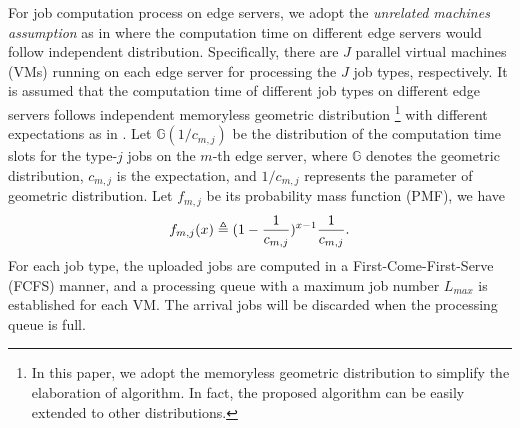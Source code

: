 For job computation process on edge servers, we adopt the \emph{unrelated machines assumption} as in \cite{tan-online} where the computation time on different edge servers would follow independent distribution.
Specifically, there are $J$ parallel virtual machines (VMs) running on each edge server for processing the $J$ job types, respectively.
It is assumed that the computation time of different job types on different edge servers follows independent memoryless geometric distribution 
\footnote{In this paper, we adopt the memoryless geometric distribution to simplify the elaboration of algorithm. In fact, the proposed algorithm can be easily extended to other distributions.}
with different expectations as in \cite{TOWC18-HuangKb}.
Let $\mathbb{G}(1/c_{m,j})$ be the distribution of the computation time slots for the type-$j$ jobs on the $m$-th edge server, where $\mathbb{G}$ denotes the geometric distribution, $c_{m,j}$ is the expectation, and {$1/c_{m,j}$ represents the parameter of geometric distribution}.
Let $f_{m,j}$ be its probability mass function (PMF), we have
\begin{align}
    f_{m,j}(x) \triangleq (1-\frac{1}{c_{m,j}})^{x-1} \frac{1}{c_{m,j}}.
\end{align}
For each job type, the uploaded jobs are computed in a First-Come-First-Serve (FCFS) manner, and a processing queue with a maximum job number $L_{max}$ is established for each VM.
The arrival jobs will be discarded when the processing queue is full.

